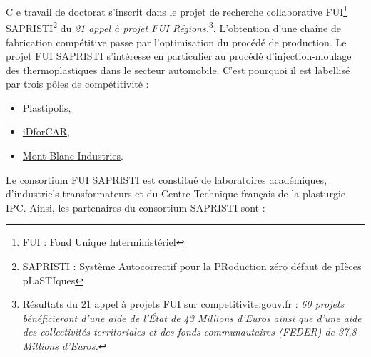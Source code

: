 
\lettrine[lines=1]{C}{ }e travail de doctorat s'inscrit dans le projet de recherche collaborative FUI\footnote{FUI : Fond Unique Interministériel} SAPRISTI\footnote{SAPRISTI : Système Autocorrectif pour la PRoduction zéro défaut de pIèces pLaSTIques} du \textit{21 appel à projet FUI Régions.}\footnote{\href{https://competitivite.gouv.fr/les-appels-a-projets-de-r-d-fui/le-21e-appel-a-projets/les-resultats-du-21e-appel-a-projets-787.html}{Résultats du 21 appel à projets FUI sur competitivite.gouv.fr} : \textit{60 projets bénéficieront d’une aide de l’État de 43 Millions d'Euros ainsi que d’une aide des collectivités territoriales et des fonds communautaires (FEDER) de 37,8 Millions d'Euros.}}.
L’obtention d’une chaîne de fabrication compétitive passe par l’optimisation du procédé de production.
Le projet FUI SAPRISTI s'intéresse en particulier au procédé d'injection-moulage des thermoplastiques dans le secteur automobile.
C'est pourquoi il est labellisé par trois pôles de compétitivité :
\begin{itemize}
	\item \href{http://www.plastipolis.fr/}{Plastipolis},
	\item \href{https://www.id4car.org}{iDforCAR},
	\item \href{https://www.montblancindustries.com/}{Mont-Blanc Industries}.
\end{itemize}
\noindent
Le consortium FUI SAPRISTI est constitué de laboratoires académiques, d'industriels transformateurs et du Centre Technique français de la plasturgie IPC.
Ainsi, les partenaires du consortium SAPRISTI sont :
